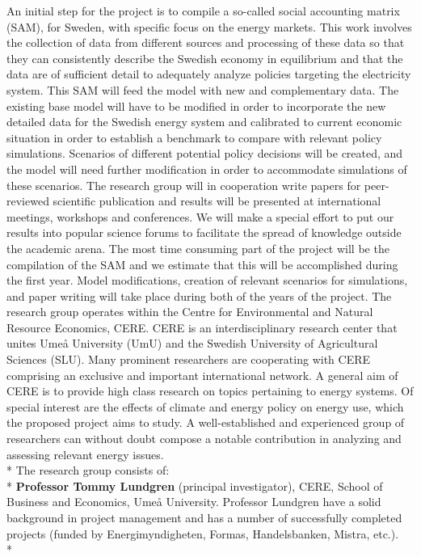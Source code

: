 An initial step for the project is to compile a so-called social accounting matrix (SAM), for Sweden, with specific focus on the energy markets. This work involves the collection of data from different sources and processing of these data so that they can consistently describe the Swedish economy in equilibrium and that the data are of sufficient detail to adequately analyze policies targeting the electricity system. This SAM will feed the model with new and complementary data.
The existing base model will have to be modified in order to incorporate the new detailed data for the Swedish energy system and calibrated to current economic situation in order to establish a benchmark to compare with relevant policy simulations. Scenarios of different potential policy decisions will be created, and the model will need further modification in order to accommodate simulations of these scenarios.
The research group will in cooperation write papers for peer-reviewed scientific publication and results will be presented at international meetings, workshops and conferences. We will make a special effort to put our results into popular science forums to facilitate the spread of knowledge outside the academic arena.
The most time consuming part of the project will be the compilation of the SAM and we estimate that this will be accomplished during the first year. Model modifications, creation of relevant scenarios for simulations, and paper writing will take place during both of the years of the project.
The research group operates within the Centre for Environmental and Natural Resource Economics, CERE. CERE is an interdisciplinary research center that unites Umeå University (UmU) and the Swedish University of Agricultural Sciences (SLU). Many prominent researchers are cooperating with CERE comprising an exclusive and important international network. A general aim of CERE is to provide high class research on topics pertaining to energy systems. Of special interest are the effects of climate and energy policy on energy use, which the proposed project aims to study. A well-established and experienced group of researchers can without doubt compose a notable contribution in analyzing and assessing relevant energy issues.\\*
The research group consists of:\\*
\textbf{Professor Tommy Lundgren} (principal investigator), CERE, School of Business and Economics, Umeå University. Professor Lundgren have a solid background in project management and has a number of successfully completed projects (funded by Energimyndigheten, Formas, Handelsbanken, Mistra, etc.).\\*
